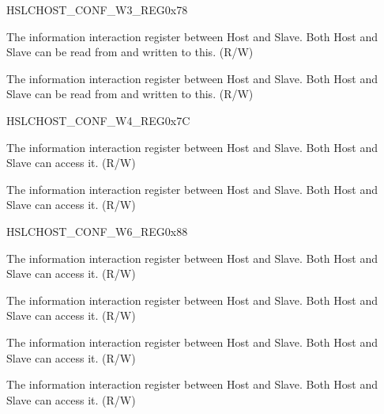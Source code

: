 \begin{register}{H}{SLCHOST\_CONF\_W3\_REG}{0x78}\label{regdesc:SLCHOSTCONFW3REG}
%
%
%
%
\regnewline%
\begin{regdesc}\begin{reglist}
\item [SLCHOST\_CONF15]The information interaction register between Host and Slave. Both Host and Slave can be read from and written to this. (R/W)
\item [SLCHOST\_CONF14]The information interaction register between Host and Slave. Both Host and Slave can be read from and written to this. (R/W)
\end{reglist}\end{regdesc}
\end{register}


\begin{register}{H}{SLCHOST\_CONF\_W4\_REG}{0x7C}\label{regdesc:SLCHOSTCONFW4REG}
%
%
%
%
\regnewline%
\begin{regdesc}\begin{reglist}
\item [SLCHOST\_CONF19]The information interaction register between Host and Slave. Both Host and Slave can access it. (R/W)
\item [SLCHOST\_CONF18]The information interaction register between Host and Slave. Both Host and Slave can access it. (R/W)
\end{reglist}\end{regdesc}
\end{register}


\begin{register}{H}{SLCHOST\_CONF\_W6\_REG}{0x88}\label{regdesc:SLCHOSTCONFW6REG}
%
%
%
%
\regnewline%
\begin{regdesc}\begin{reglist}
\item [SLCHOST\_CONF27]The information interaction register between Host and Slave. Both Host and Slave can access it. (R/W)
\item [SLCHOST\_CONF26]The information interaction register between Host and Slave. Both Host and Slave can access it. (R/W)
\item [SLCHOST\_CONF25]The information interaction register between Host and Slave. Both Host and Slave can access it. (R/W)
\item [SLCHOST\_CONF24]The information interaction register between Host and Slave. Both Host and Slave can access it. (R/W)
\end{reglist}\end{regdesc}
\end{register}




